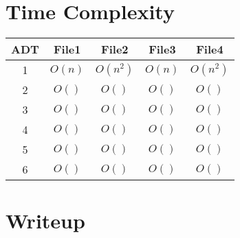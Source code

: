 \documentclass[12pt]{article}
\begin{document}
\section{Time Complexity}

\begin{center}
    \begin{tabular}{c c c c c}
        ADT & File1  & File2    & File3 & File4 \\
        \hline
        1   & $O(n)$ & $O(n^2)$ & $O(n)$ & $O(n^2)$ \\
        2   & $O()$  & $O()$    & $O()$ & $O()$ \\
        3   & $O()$  & $O()$    & $O()$ & $O()$ \\
        4   & $O()$  & $O()$    & $O()$ & $O()$ \\
        5   & $O()$  & $O()$    & $O()$ & $O()$ \\
        6   & $O()$  & $O()$    & $O()$ & $O()$
    \end{tabular}
\end{center}

\section{Writeup}

\begin{doublespace}
    \lipsum[1-7]
\end{doublespace}
\end{document}
